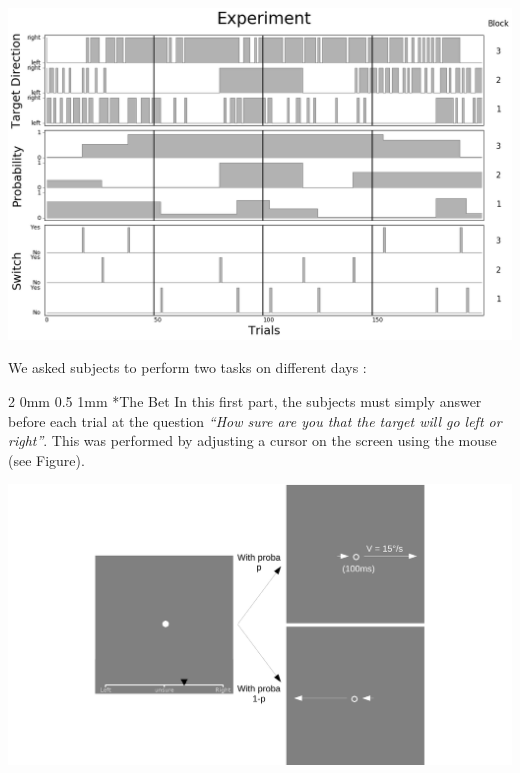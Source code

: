 \documentclass[profile,final,english, draft]{article}%
\makeatletter
\renewcommand{\subsection}{\@startsection
        {subsection}%
        {2}%
        {0mm}%
        {0.5\baselineskip}%
        {1mm}%
        {\normalsize\color[rgb]{0.4,0,0}\bfseries}}%
\makeatother
\begin{document}
\begin{multicols}{3}
\begin{center} 
    \includegraphics[width=1\columnwidth]{exp}
\end{center}

We asked subjects to perform two tasks on different days :

\subsection*{The Bet}
In this first part, the subjects must simply answer before each trial at the question \textit{ ``How sure are you that the target will go left or right''}. This was performed by adjusting a cursor on the screen using the mouse (see Figure).
\begin{center} 
    \includegraphics[width=1\columnwidth]{materiel_bet}
\end{center}


\end{multicols}
\end{document}
